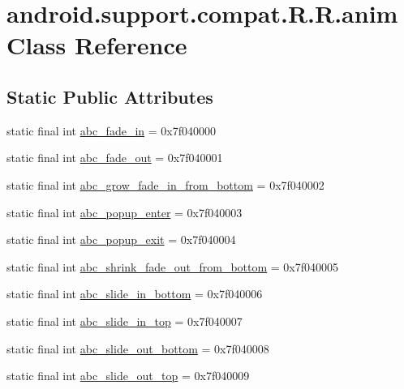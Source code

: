 \hypertarget{classandroid_1_1support_1_1compat_1_1_r_1_1anim}{
\section{android.support.compat.R.R.anim Class Reference}
\label{classandroid_1_1support_1_1compat_1_1_r_1_1anim}
}
\subsection*{Static Public Attributes}
\begin{CompactItemize}
\item 
static final int \hyperlink{classandroid_1_1support_1_1compat_1_1_r_1_1anim_d33449142fa6bbca5de60316ad14983f}{abc\_\-fade\_\-in} = 0x7f040000
\item 
static final int \hyperlink{classandroid_1_1support_1_1compat_1_1_r_1_1anim_4e1bc4ef9b35b754f8463fa27d4021ed}{abc\_\-fade\_\-out} = 0x7f040001
\item 
static final int \hyperlink{classandroid_1_1support_1_1compat_1_1_r_1_1anim_2312d0af7d994635a004d64d752809d1}{abc\_\-grow\_\-fade\_\-in\_\-from\_\-bottom} = 0x7f040002
\item 
static final int \hyperlink{classandroid_1_1support_1_1compat_1_1_r_1_1anim_ed30290dbe1f3b0ee94fa81e961d9370}{abc\_\-popup\_\-enter} = 0x7f040003
\item 
static final int \hyperlink{classandroid_1_1support_1_1compat_1_1_r_1_1anim_0aaaf25333a178dab22bb38af378b62c}{abc\_\-popup\_\-exit} = 0x7f040004
\item 
static final int \hyperlink{classandroid_1_1support_1_1compat_1_1_r_1_1anim_23e6ca8b4fe06758419faaac2939d62c}{abc\_\-shrink\_\-fade\_\-out\_\-from\_\-bottom} = 0x7f040005
\item 
static final int \hyperlink{classandroid_1_1support_1_1compat_1_1_r_1_1anim_058c4a8baa799a4aae12642faae403bd}{abc\_\-slide\_\-in\_\-bottom} = 0x7f040006
\item 
static final int \hyperlink{classandroid_1_1support_1_1compat_1_1_r_1_1anim_c1e17064ab9c07e883f2775ca9285625}{abc\_\-slide\_\-in\_\-top} = 0x7f040007
\item 
static final int \hyperlink{classandroid_1_1support_1_1compat_1_1_r_1_1anim_d91de4ddeeec9de8043393ada41b52c5}{abc\_\-slide\_\-out\_\-bottom} = 0x7f040008
\item 
static final int \hyperlink{classandroid_1_1support_1_1compat_1_1_r_1_1anim_155f712034d46db182c3b786d757cab7}{abc\_\-slide\_\-out\_\-top} = 0x7f040009

\end{CompactItemize}
